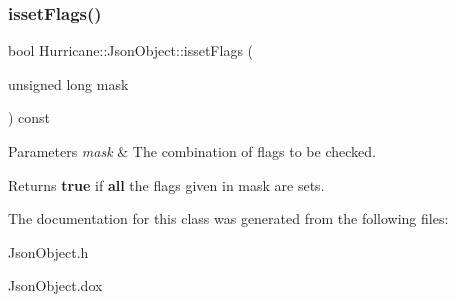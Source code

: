 \subsubsection{\texorpdfstring{isset\+Flags()}{issetFlags()}}
{\footnotesize\ttfamily bool Hurricane\+::\+Json\+Object\+::isset\+Flags (\begin{DoxyParamCaption}\item[{unsigned long}]{mask }\end{DoxyParamCaption}) const\hspace{0.3cm}{\ttfamily [inline]}}


\begin{DoxyParams}{Parameters}
{\em mask} & The combination of flags to be checked. \\
\hline
\end{DoxyParams}
\begin{DoxyReturn}{Returns}
{\bfseries true} if {\bfseries all} the flags given in {\ttfamily mask} are sets. 
\end{DoxyReturn}


The documentation for this class was generated from the following files\+:\begin{DoxyCompactItemize}
\item 
Json\+Object.\+h\item 
Json\+Object.\+dox\end{DoxyCompactItemize}
